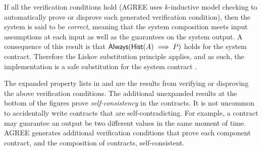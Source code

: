 If all the verification conditions hold (AGREE uses $k$-inductive
model checking to automatically prove or disprove each generated
verification condition), then the system is said to be \emph{correct},
meaning that the system composition meets input assumptions at each
input as well as the guarantees on the system output. A consequence of
this result is that $\mathsf{Always}(\mathsf{Hist}(A) \implies
P)$ holds for the system contract.
Therefore the Liskov substitution principle applies, and as such, the implementation is a safe substitution for the system contract \cite{10.1145/62139.62141}.

The expanded property lists in  and
 are the results from verifying or
disproving the above verification conditions.  The additional
unexpanded results at the bottom of the figures prove
\emph{self-consistency} in the contracts.  It is not uncommon to
accidentally write contracts that are self-contradicting.  For
example, a contract may guarantee an output be two different values in
the same moment of time.  AGREE generates additional verification
conditions that prove each component contract, and the composition of
contracts, self-consistent.
